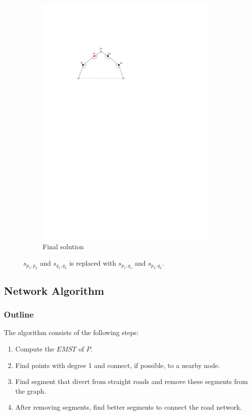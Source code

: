 \documentclass[11pt]{article}
\begin{document}
\begin{figure}[hbtp]
\begin{subfigure}{.33\linewidth}
  \includegraphics[width=0.9\linewidth]{multiplecurves/algo_final.pdf}
  \caption{Final solution}
\end{subfigure}%
  \caption{$s_{p_1,p_2}$ and $s_{q_1,q_2}$ is replaced with $s_{p_1,q_1}$ and $s_{p_2,q_2}$.}
\label{fig:multiple_pppqq}
\end{figure}


\subsection{Network Algorithm}
\subsubsection{Outline}
The algorithm consists of the following steps:
\begin{enumerate}
  \item Compute the $EMST$ of $P$.
  \item Find points with degree 1 and connect, if possible, to a nearby node.
  \item Find segment that divert from straight roads and remove these segments from the graph.
  \item After removing segments, find better segments to connect the road network.
\end{enumerate}
  
\end{document}
